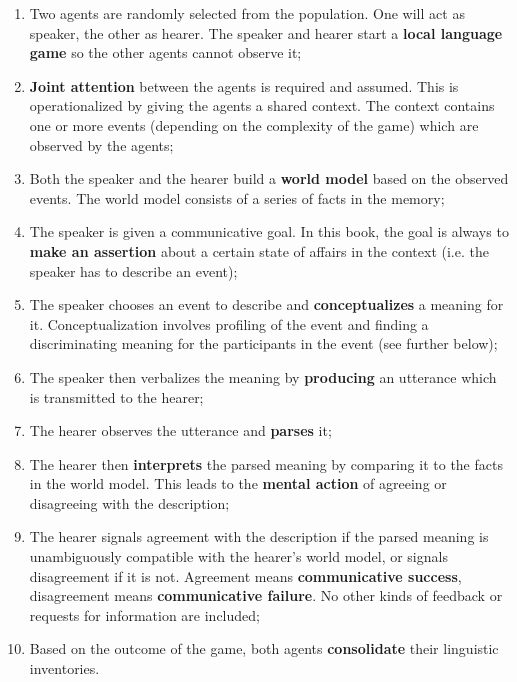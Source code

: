 \begin{enumerate}
\item Two agents are randomly selected from the population. One will act as speaker, the other as hearer. The speaker and hearer start a {\bfseries local language game} so the other agents cannot observe it;
\item {\bfseries Joint attention} \citep{tomasello95jointattention} between the agents is required and assumed. This is operationalized by giving the agents a shared context. The context contains one or more events (depending on the complexity of the game) which are observed by the agents;
\item Both the speaker and the hearer build a {\bfseries world model} based on the observed events. The world model consists of a series of facts in the memory;
\item The speaker is given a communicative goal. In this book, the goal is always to {\bfseries make an assertion} about a certain state of affairs in the context (i.e. the speaker has to describe an event);
\item The speaker chooses an event to describe and {\bfseries conceptualizes} a meaning for it. Conceptualization involves profiling of the event and finding a discriminating meaning for the participants in the event (see further below);
\item The speaker then verbalizes the meaning by {\bfseries producing} an utterance which is transmitted to the hearer;
\item The hearer observes the utterance and {\bfseries parses} it;
\item The hearer then {\bfseries interprets} the parsed meaning by comparing it to the facts in the world model. This leads to the {\bfseries mental action} of agreeing or disagreeing with the description;
\item The hearer signals agreement with the description if the parsed meaning is unambiguously compatible with the hearer's world model, or signals disagreement if it is not. Agreement means {\bfseries communicative success}, disagreement means {\bfseries communicative failure}. No other kinds of feedback or requests for information are included;
\item Based on the outcome of the game, both agents {\bfseries consolidate} their linguistic inventories. 
\end{enumerate}


